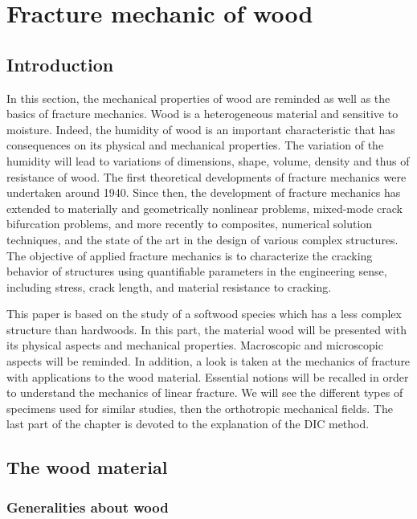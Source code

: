 \chapter{Fracture mechanic of wood}
\label{Chapter1}

\section{Introduction}

In this section, the mechanical properties of wood are reminded as well as the basics of fracture mechanics. 
Wood is a heterogeneous material and sensitive to moisture. Indeed, the humidity of wood is an important characteristic that has consequences on its physical and mechanical properties. The variation of the humidity will lead to variations of dimensions, shape, volume, density and thus of resistance of wood. 
The first theoretical developments of fracture mechanics were undertaken around 1940. Since then, the development of fracture mechanics has extended to materially and geometrically nonlinear problems, mixed-mode crack bifurcation problems, and more recently to composites, numerical solution techniques, and the state of the art in the design of various complex structures. The objective of applied fracture mechanics is to characterize the cracking behavior of structures using quantifiable parameters in the engineering sense, including stress, crack length, and material resistance to cracking.

This paper is based on the study of a softwood species which has a less complex structure than hardwoods. In this part, the material wood will be presented with its physical aspects and mechanical properties. Macroscopic and microscopic aspects will be reminded.
In addition, a look is taken at the mechanics of fracture with applications to the wood material. Essential notions will be recalled in order to understand the mechanics of linear fracture. We will see the different types of specimens used for similar studies, then the orthotropic mechanical fields. The last part of the chapter is devoted to the explanation of the DIC method.

\section{The wood material}

\subsection{Generalities about wood}

